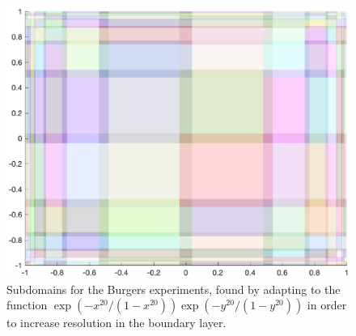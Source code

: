 \begin{figure}
  \centering
  \includegraphics[scale = 0.6 ]{Chapter3/BurgersGrid}
  \caption{Subdomains for the Burgers experiments, found by adapting to the function  $\exp(-x^{20}/(1-x^{20}))\exp(-y^{20}/(1-y^{20}))$ in order to increase resolution in the boundary layer.}
  \label{Burger_patch_structure}
\end{figure}

